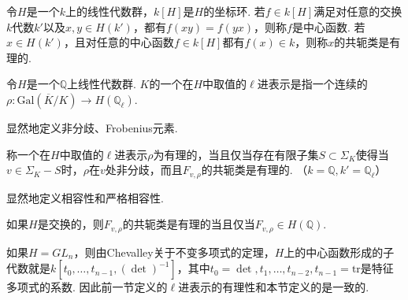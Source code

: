\begin{cdef}
    令$H$是一个$k$上的线性代数群，$k[H]$是$H$的坐标环. 若$f\in k[H]$满足对任意的交换$k$代数$k'$以及$x,y\in H(k')$，都有$f(xy)=f(yx)$，则称$f$是中心函数. 若$x\in H(k')$，且对任意的中心函数$f\in k[H]$都有$f(x)\in k$，则称$x$的共轭类是有理的.
\end{cdef}

\begin{cdef}
    令$H$是一个$\mathbb{Q}$上线性代数群. $K$的一个在$H$中取值的$\ell$进表示是指一个连续的$\rho: \mathrm{Gal}(\overline{K}/K)\to H(\mathbb{Q}_{\ell})$.
\end{cdef}

显然地定义非分歧、Frobenius元素.

\begin{cdef}
    称一个在$H$中取值的$\ell$进表示$\rho$为有理的，当且仅当存在有限子集$S\subset \Sigma_K$使得当$v\in \Sigma_K - S$时，$\rho$在$v$处非分歧，而且$F_{v, \rho}$的共轭类是有理的. （$k=\mathbb{Q}, k'=\mathbb{Q}_{\ell}$）
\end{cdef}

显然地定义相容性和严格相容性.

\begin{crem}
    如果$H$是交换的，则$F_{v,\rho}$的共轭类是有理的当且仅当$F_{v,\rho} \in H(\mathbb{Q})$.
\end{crem}

\begin{crem}
    如果$H = GL_n$，则由Chevalley关于不变多项式的定理，$H$上的中心函数形成的子代数就是$k[t_0,\ldots,t_{n-1}, (\det)^{-1}]$，其中$t_0=\det,t_1,\ldots,t_{n-2},t_{n-1}=\mathrm{tr}$是特征多项式的系数. 因此前一节定义的$\ell$进表示的有理性和本节定义的是一致的.
\end{crem}
